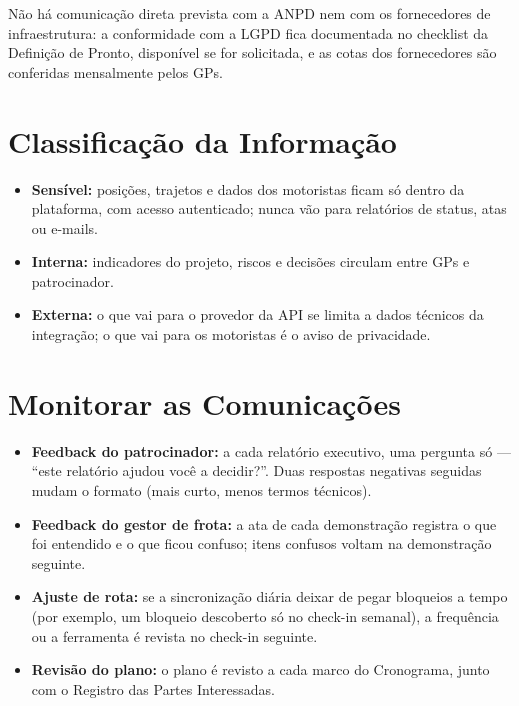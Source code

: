 \documentclass[11pt,a4paper]{article}
\begin{document}
\noindent Não há comunicação direta prevista com a ANPD nem com os fornecedores de infraestrutura: a conformidade com a LGPD fica documentada no checklist da Definição de Pronto, disponível se for solicitada, e as cotas dos fornecedores são conferidas mensalmente pelos GPs.

\section{Classificação da Informação}
\begin{itemize}[itemsep=2pt]
  \item \textbf{Sensível:} posições, trajetos e dados dos motoristas ficam só dentro da plataforma, com acesso autenticado; nunca vão para relatórios de status, atas ou e-mails.
  \item \textbf{Interna:} indicadores do projeto, riscos e decisões circulam entre GPs e patrocinador.
  \item \textbf{Externa:} o que vai para o provedor da API se limita a dados técnicos da integração; o que vai para os motoristas é o aviso de privacidade.
\end{itemize}

\section{Monitorar as Comunicações}
\begin{itemize}[itemsep=4pt]
  \item \textbf{Feedback do patrocinador:} a cada relatório executivo, uma pergunta só --- ``este relatório ajudou você a decidir?''. Duas respostas negativas seguidas mudam o formato (mais curto, menos termos técnicos).
  \item \textbf{Feedback do gestor de frota:} a ata de cada demonstração registra o que foi entendido e o que ficou confuso; itens confusos voltam na demonstração seguinte.
  \item \textbf{Ajuste de rota:} se a sincronização diária deixar de pegar bloqueios a tempo (por exemplo, um bloqueio descoberto só no check-in semanal), a frequência ou a ferramenta é revista no check-in seguinte.
  \item \textbf{Revisão do plano:} o plano é revisto a cada marco do Cronograma, junto com o Registro das Partes Interessadas.
\end{itemize}
\end{document}

